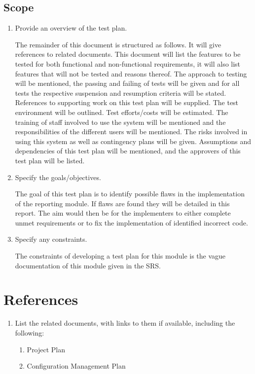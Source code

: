 \subsection{Scope}
\begin{enumerate}
	\item Provide an overview of the test plan.
		
The remainder of this document is structured as follows. It will give references to related documents. This document will   list the features to be tested for both functional and non-functional requirements, it will also list features that will not be tested and reasons thereof. The approach to testing will be mentioned, the passing and failing of tests will be given and for all tests the respective suspension and resumption criteria will be stated. References to supporting work on this test plan will be supplied. The test environment will be outlined. Test efforts/costs will be estimated. The training of staff involved to use the system will be mentioned and the responsibilities of the different users will be mentioned. The risks involved in using this system as well as contingency plans will be given. Assumptions and dependencies of this test plan will be mentioned, and the approvers of this test plan will be listed.

	\item Specify the goals/objectives.

The goal of this test plan is to identify possible flaws in the implementation of the reporting module. If flaws are found they will be detailed in this report. The aim would then be for the implementers to either complete unmet requirements or to fix the implementation of identified incorrect code.

	\item Specify any constraints.

The constraints of developing a test plan for this module is the vague documentation of this module given in the SRS. 
\end{enumerate} 
\section{References} 
\begin{enumerate}
	\item List the related documents, with links to them if available, including the following:

\begin{enumerate}
	\item Project Plan
	\item Configuration Management Plan
\end{enumerate}
\end{enumerate}

